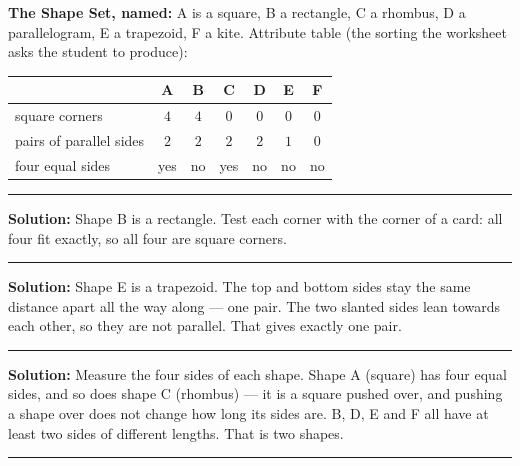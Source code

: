 \documentclass[12pt]{article}
\begin{document}


\noindent\textbf{The Shape Set, named:} A is a square, B a rectangle, C a rhombus, D a
parallelogram, E a trapezoid, F a kite. Attribute table (the sorting the worksheet asks the student
to produce):\par
\vspace{2pt}
\noindent\begin{tabular}{lcccccc}
\toprule
 & A & B & C & D & E & F \\
\midrule
square corners & $4$ & $4$ & $0$ & $0$ & $0$ & $0$ \\
pairs of parallel sides & $2$ & $2$ & $2$ & $2$ & $1$ & $0$ \\
four equal sides & yes & no & yes & no & no & no \\
\bottomrule
\end{tabular}

\vspace{0.2cm}\noindent\rule{\linewidth}{0.4pt}


\textbf{Solution:} Shape B is a rectangle. Test each corner with the corner of a card: all four fit
exactly, so all four are square corners. 

\vspace{0.15cm}\noindent\rule{\linewidth}{0.2pt}


\textbf{Solution:} Shape E is a trapezoid. The top and bottom sides stay the same distance apart all
the way along --- one pair. The two slanted sides lean towards each other, so they are not parallel.
That gives exactly one pair. 

\vspace{0.15cm}\noindent\rule{\linewidth}{0.2pt}


\textbf{Solution:} Measure the four sides of each shape. Shape A (square) has four equal sides, and so
does shape C (rhombus) --- it is a square pushed over, and pushing a shape over does not change how
long its sides are. B, D, E and F all have at least two sides of different lengths. That is two
shapes. 

\vspace{0.15cm}\noindent\rule{\linewidth}{0.2pt}
\end{document}
